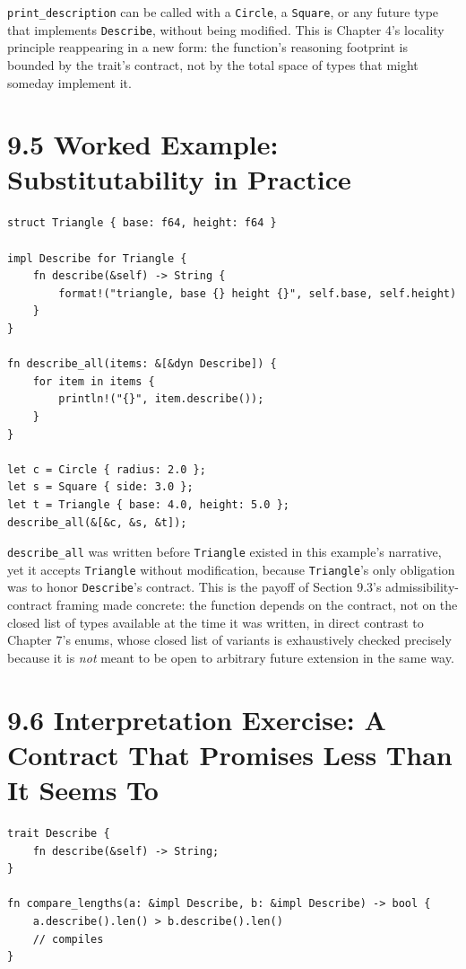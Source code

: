 \documentclass[11pt]{book}
\begin{document}
\texttt{print\_description} can be called with a \texttt{Circle}, a \texttt{Square}, or any future type that implements \texttt{Describe}, without being modified. This is Chapter 4's locality principle reappearing in a new form: the function's reasoning footprint is bounded by the trait's contract, not by the total space of types that might someday implement it.

\section*{9.5 Worked Example: Substitutability in Practice}

\begin{lstlisting}
struct Triangle { base: f64, height: f64 }

impl Describe for Triangle {
    fn describe(&self) -> String {
        format!("triangle, base {} height {}", self.base, self.height)
    }
}

fn describe_all(items: &[&dyn Describe]) {
    for item in items {
        println!("{}", item.describe());
    }
}

let c = Circle { radius: 2.0 };
let s = Square { side: 3.0 };
let t = Triangle { base: 4.0, height: 5.0 };
describe_all(&[&c, &s, &t]);
\end{lstlisting}

\texttt{describe\_all} was written before \texttt{Triangle} existed in this example's narrative, yet it accepts \texttt{Triangle} without modification, because \texttt{Triangle}'s only obligation was to honor \texttt{Describe}'s contract. This is the payoff of Section 9.3's admissibility-contract framing made concrete: the function depends on the contract, not on the closed list of types available at the time it was written, in direct contrast to Chapter 7's enums, whose closed list of variants is exhaustively checked precisely because it is \emph{not} meant to be open to arbitrary future extension in the same way.

\section*{9.6 Interpretation Exercise: A Contract That Promises Less Than It Seems To}

\begin{lstlisting}
trait Describe {
    fn describe(&self) -> String;
}

fn compare_lengths(a: &impl Describe, b: &impl Describe) -> bool {
    a.describe().len() > b.describe().len()
    // compiles
}
\end{lstlisting}
\end{document}
